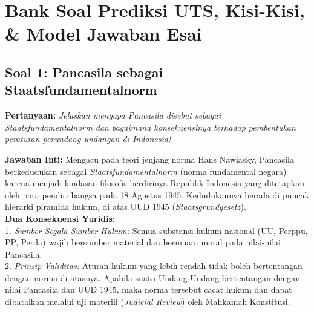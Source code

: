 \documentclass[10pt,a4paper]{article}
\begin{document}
\section{Bank Soal Prediksi UTS, Kisi-Kisi, \& Model Jawaban Esai}

\subsection{Soal 1: Pancasila sebagai Staatsfundamentalnorm}
\textbf{Pertanyaan:} \textit{Jelaskan mengapa Pancasila disebut sebagai Staatsfundamentalnorm dan bagaimana konsekuensinya terhadap pembentukan peraturan perundang-undangan di Indonesia!}
\begin{conceptbox}
\textbf{Jawaban Inti:} Mengacu pada teori jenjang norma Hans Nawiasky, Pancasila berkedudukan sebagai \textit{Staatsfundamentalnorm} (norma fundamental negara) karena menjadi landasan filosofis berdirinya Republik Indonesia yang ditetapkan oleh para pendiri bangsa pada 18 Agustus 1945. Kedudukannya berada di puncak hierarki piramida hukum, di atas UUD 1945 (\textit{Staatsgrundgesetz}).\\
\textbf{Dua Konsekuensi Yuridis:}\\
1. \textit{Sumber Segala Sumber Hukum:} Semua substansi hukum nasional (UU, Perppu, PP, Perda) wajib bersumber material dan bermuara moral pada nilai-nilai Pancasila.\\
2. \textit{Prinsip Validitas:} Aturan hukum yang lebih rendah tidak boleh bertentangan dengan norma di atasnya. Apabila suatu Undang-Undang bertentangan dengan nilai Pancasila dan UUD 1945, maka norma tersebut cacat hukum dan dapat dibatalkan melalui uji materiil (\textit{Judicial Review}) oleh Mahkamah Konstitusi.
\end{conceptbox}
\end{document}
